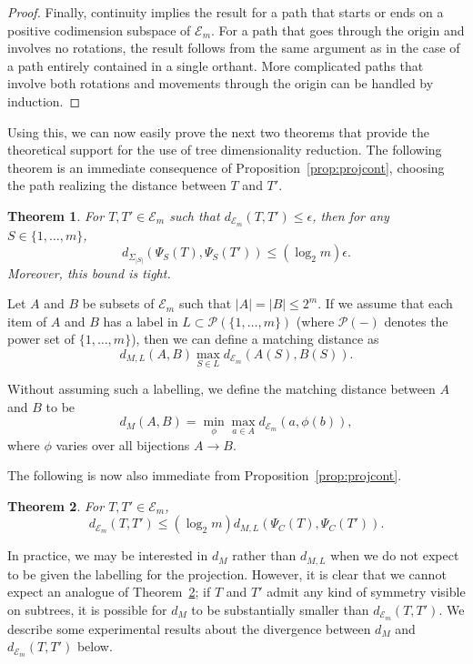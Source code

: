 \documentclass[a4paper,11pt]{article}
\newtheorem{theorem}{Theorem}
\newcommand{\aE}{\mathcal{E}}
\newcommand{\aP}{\mathcal{P}}
\begin{document}
\begin{proof}
Finally, continuity implies the result for a path that starts or ends on a positive codimension subspace of $\aE_m$.  For a path that goes through the origin and involves no rotations, the result follows from the same argument as in the case of a path entirely contained in a single orthant.  More complicated paths that involve both rotations and movements through the origin can be handled by induction.
\end{proof}

Using this, we can now easily prove the next two theorems that provide the theoretical support for the use of tree dimensionality reduction.
The following theorem is an immediate consequence of Proposition~\ref{prop:projcont}, choosing the path realizing the distance between $T$ and $T'$.

\begin{theorem}
For $T,T' \in \aE_m$ such that $d_{\aE_m}(T,T') \leq \epsilon$, then for any $S \in \{1,\ldots,m\}$,
\[
d_{\Sigma_{|S|}}(\Psi_S(T), \Psi_S(T')) \leq (\log_2 m)\epsilon.
\]
Moreover, this bound is tight.
\end{theorem}

Let $A$ and $B$ be subsets of $\aE_m$ such that $|A| = |B| \leq 2^m$.  
If we assume that each item of $A$ and $B$ has a label in $L \subset \aP(\{1,\ldots,m\})$ (where $\aP(-)$ denotes the power set of $\{1,\ldots,m\}$), then we can define a matching distance as
\[
d_{M,L}(A,B) \max_{S \in L} d_{\aE_m}(A(S), B(S)).
\]

Without assuming such a labelling, we define the matching distance between $A$ and $B$ to be 
\[
d_M(A,B) = \min_{\phi} \max_{a \in A} d_{\aE_m}(a,\phi(b)),
\]
where $\phi$ varies over all bijections $A \to B$.

The following is now also immediate from Proposition~\ref{prop:projcont}.

\begin{theorem}\label{thm:converse}
For $T, T' \in \aE_m$, 
\[
d_{\aE_m}(T,T') \leq (\log_2 m) d_{M,L}(\Psi_C(T), \Psi_C(T')).
\]
\end{theorem}

In practice, we may be interested in $d_M$ rather than $d_{M,L}$ when we do not expect to be given the labelling for the projection.
However, it is clear that we cannot expect an analogue of Theorem~\ref{thm:converse}; if $T$ and $T'$ admit any kind of symmetry visible on subtrees, it is possible for $d_M$ to be substantially smaller than $d_{\aE_m}(T,T')$.
We describe some experimental results about the divergence between $d_M$ and $d_{\aE_m}(T,T')$ below.
\end{document}
